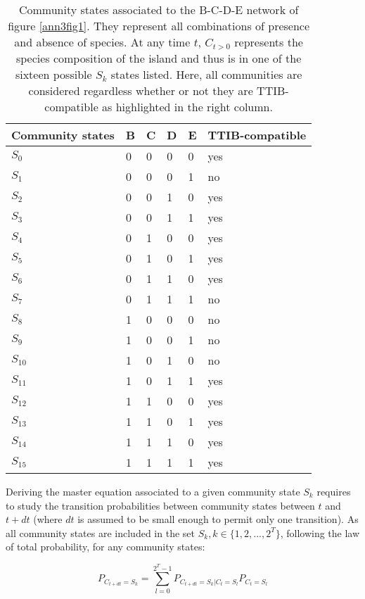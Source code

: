 \begin{table}[]
\centering
\caption[Community states associated to simple networks]{Community states
associated to the B-C-D-E network of figure \ref{ann3fig1}. They represent
all combinations of presence and absence of species. At any time
\(t\), \(C_{t>0}\) represents the species composition of the island and
thus is in one of the sixteen possible \(S_k\) states listed. Here, all
communities are considered regardless whether or not they are TTIB-compatible
as highlighted in the right column.}
\label{tabAnnIII_1}
  \begin{tabular}{|l|l|l|l|l|l|}
    Community states & B & C & D & E & TTIB-compatible \\ \hline
    \(S_{0}\) & 0 & 0 & 0 & 0 & yes \\
    \(S_{1}\) & 0 & 0 & 0 & 1 & no \\
    \(S_{2}\) & 0 & 0 & 1 & 0 & yes \\
    \(S_{3}\) & 0 & 0 & 1 & 1 & yes \\
    \(S_{4}\) & 0 & 1 & 0 & 0 & yes \\
    \(S_{5}\) & 0 & 1 & 0 & 1 & yes \\
    \(S_{6}\) & 0 & 1 & 1 & 0 & yes \\
    \(S_{7}\) & 0 & 1 & 1 & 1 & no \\
    \(S_{8}\) & 1 & 0 & 0 & 0 & no \\
    \(S_{9}\) & 1 & 0 & 0 & 1 & no \\
    \(S_{10}\) & 1 & 0 & 1 & 0 & no \\
    \(S_{11}\) & 1 & 0 & 1 & 1 & yes \\
    \(S_{12}\) & 1 & 1 & 0 & 0 & yes \\
    \(S_{13}\) & 1 & 1 & 0 & 1 & yes \\
    \(S_{14}\) & 1 & 1 & 1 & 0 & yes \\
    \(S_{15}\) & 1 & 1 & 1 & 1 & yes
  \end{tabular}
\end{table}


Deriving the master equation associated to a given community state
\(S_k\) requires to study the transition probabilities between community
states between \(t\) and \(t+dt\) (where \(dt\) is assumed to be small enough
to permit only one transition). As all community states are included
in the set \(S_k, k\in\{1,2,...,2^T\}\), following the law of total
probability, for any community states:

\begin{equation}
P_{C_{t+dt}=S_{k}}= \sum_{l=0}^{2^T-1} P_{C_{t+dt}=S_k|C_{t}=S_l}P_{C_{t}=S_l}
\end{equation}

